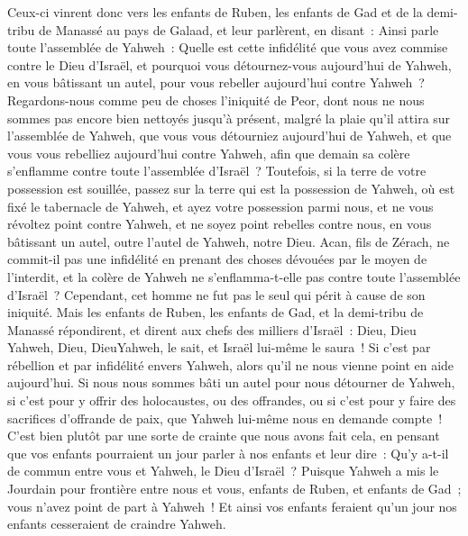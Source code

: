 \begin{multicols}{2}
Ceux-ci vinrent donc vers les enfants de Ruben, les enfants de Gad et de la demi-tribu de Manassé au pays de Galaad, et leur parlèrent, en disant~:
Ainsi parle toute l'assemblée de Yahweh~: Quelle est cette infidélité que vous avez commise contre le Dieu d'Israël, et pourquoi vous détournez-vous aujourd'hui de Yahweh, en vous bâtissant un autel, pour vous rebeller aujourd'hui contre Yahweh~?
Regardons-nous comme peu de choses l'iniquité de Peor, dont nous ne nous sommes pas encore bien nettoyés jusqu'à présent, malgré la plaie qu'il attira sur l'assemblée de Yahweh,
que vous vous détourniez aujourd'hui de Yahweh, et que vous vous rebelliez aujourd'hui contre Yahweh, afin que demain sa colère s'enflamme contre toute l'assemblée d'Israël~?
Toutefois, si la terre de votre possession est souillée, passez sur la terre qui est la possession de Yahweh, où est fixé le tabernacle de Yahweh, et ayez votre possession parmi nous, et ne vous révoltez point contre Yahweh, et ne soyez point rebelles contre nous, en vous bâtissant un autel, outre l'autel de Yahweh, notre Dieu.
Acan, fils de Zérach, ne commit-il pas une infidélité en prenant des choses dévouées par le moyen de l'interdit, et la colère de Yahweh ne s'enflamma-t-elle pas contre toute l'assemblée d'Israël~? Cependant, cet homme ne fut pas le seul qui périt à cause de son iniquité.
Mais les enfants de Ruben, les enfants de Gad, et la demi-tribu de Manassé répondirent, et dirent aux chefs des milliers d'Israël~:
Dieu, Dieu Yahweh, Dieu, DieuYahweh, le sait, et Israël lui-même le saura~! Si c'est par rébellion et par infidélité envers Yahweh, alors qu'il ne nous vienne point en aide aujourd'hui.
Si nous nous sommes bâti un autel pour nous détourner de Yahweh, si c'est pour y offrir des holocaustes, ou des offrandes, ou si c'est pour y faire des sacrifices d'offrande de paix, que Yahweh lui-même nous en demande compte~!
C'est bien plutôt par une sorte de crainte que nous avons fait cela, en pensant que vos enfants pourraient un jour parler à nos enfants et leur dire~: Qu'y a-t-il de commun entre vous et Yahweh, le Dieu d'Israël~?
Puisque Yahweh a mis le Jourdain pour frontière entre nous et vous, enfants de Ruben, et enfants de Gad~; vous n'avez point de part à Yahweh~! Et ainsi vos enfants feraient qu'un jour nos enfants cesseraient de craindre Yahweh.

\end{multicols}
